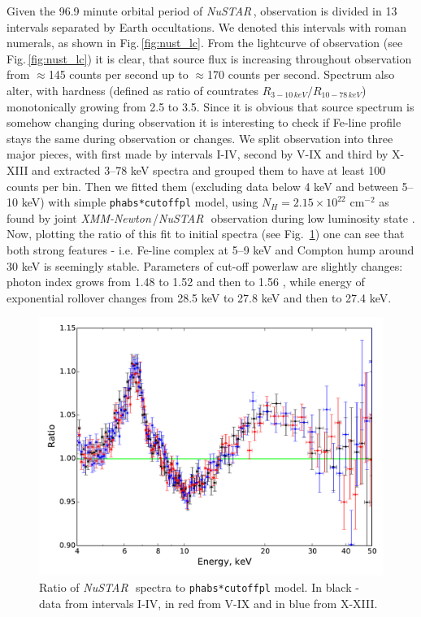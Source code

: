 \documentclass[a4paper,fleqn,usenatbib]{mnras}
\def\xmm{{\em XMM-Newton\,}}
\def\nustar{{\em NuSTAR\,}}
\begin{document}
Given the 96.9 minute orbital period of \nustar, observation is divided in 13 intervals separated by Earth occultations. We denoted this intervals with roman numerals, as shown in Fig.\,\ref{fig:nust_lc}. From the lightcurve of observation (see Fig.\,\ref{fig:nust_lc}) it is clear, that source flux is increasing throughout observation from $\approx$145 counts per second up to $\approx$170 counts per second. Spectrum also alter, with hardness (defined as ratio of countrates  $R_{3-10\,keV}/R_{10-78\,keV}$) monotonically growing from 2.5 to 3.5. Since it is obvious that source spectrum is somehow changing during observation it is interesting to check if  Fe-line profile stays the same during observation or changes. We split observation into three major pieces, with first made by intervals I-IV, second by V-IX and third by X-XIII and extracted 3--78 keV spectra and grouped them to have at least 100 counts per bin. Then we fitted them (excluding data below 4 keV and between 5--10 keV)   with simple \texttt{phabs*cutoffpl} model, using $N_{H} = 2.15\times10^{22}$ cm$^{-2}$ as found by joint \xmm/\nustar\, observation during low luminosity state \citep{fuerst16}. Now, plotting the ratio of this fit to initial spectra (see Fig.~\ref{fig:ratios}) one can see that both strong features - i.e. Fe-line complex at 5--9 keV and Compton hump around 30 keV is seemingly stable. Parameters of  cut-off powerlaw are slightly changes: photon index grows from 1.48 to 1.52 and then to 1.56 , while energy of exponential rollover changes from 28.5 keV to 27.8 keV and then to 27.4 keV. 
      
 \begin{figure}
\centerline{\includegraphics[width=\linewidth]{ratios_v01.pdf}}
\caption{Ratio of \nustar\, spectra to \texttt{phabs*cutoffpl} model. In black - data from intervals I-IV, in red from V-IX and in blue from X-XIII.} 
\label{fig:ratios}
\end{figure}  
            
\end{document}
